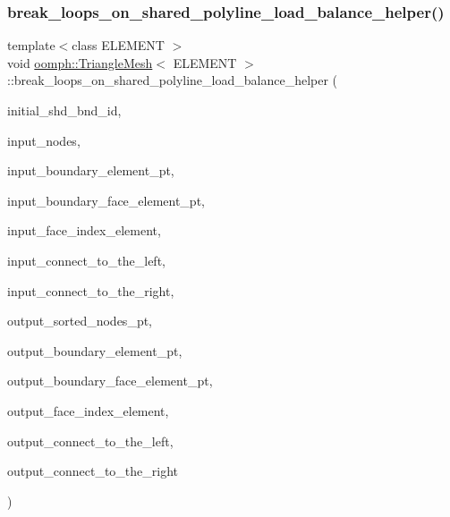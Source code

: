 \subsubsection{\texorpdfstring{break\+\_\+loops\+\_\+on\+\_\+shared\+\_\+polyline\+\_\+load\+\_\+balance\+\_\+helper()}{break\_loops\_on\_shared\_polyline\_load\_balance\_helper()}}
{\footnotesize\ttfamily template$<$class E\+L\+E\+M\+E\+NT $>$ \\
void \hyperlink{classoomph_1_1TriangleMesh}{oomph\+::\+Triangle\+Mesh}$<$ E\+L\+E\+M\+E\+NT $>$\+::break\+\_\+loops\+\_\+on\+\_\+shared\+\_\+polyline\+\_\+load\+\_\+balance\+\_\+helper (\begin{DoxyParamCaption}\item[{const unsigned \&}]{initial\+\_\+shd\+\_\+bnd\+\_\+id,  }\item[{std\+::list$<$ \hyperlink{classoomph_1_1Node}{Node} $\ast$$>$ \&}]{input\+\_\+nodes,  }\item[{\hyperlink{classoomph_1_1Vector}{Vector}$<$ \hyperlink{classoomph_1_1FiniteElement}{Finite\+Element} $\ast$$>$ \&}]{input\+\_\+boundary\+\_\+element\+\_\+pt,  }\item[{\hyperlink{classoomph_1_1Vector}{Vector}$<$ \hyperlink{classoomph_1_1FiniteElement}{Finite\+Element} $\ast$$>$ \&}]{input\+\_\+boundary\+\_\+face\+\_\+element\+\_\+pt,  }\item[{\hyperlink{classoomph_1_1Vector}{Vector}$<$ int $>$ \&}]{input\+\_\+face\+\_\+index\+\_\+element,  }\item[{const int \&}]{input\+\_\+connect\+\_\+to\+\_\+the\+\_\+left,  }\item[{const int \&}]{input\+\_\+connect\+\_\+to\+\_\+the\+\_\+right,  }\item[{\hyperlink{classoomph_1_1Vector}{Vector}$<$ std\+::list$<$ \hyperlink{classoomph_1_1Node}{Node} $\ast$$>$ $>$ \&}]{output\+\_\+sorted\+\_\+nodes\+\_\+pt,  }\item[{\hyperlink{classoomph_1_1Vector}{Vector}$<$ \hyperlink{classoomph_1_1Vector}{Vector}$<$ \hyperlink{classoomph_1_1FiniteElement}{Finite\+Element} $\ast$$>$ $>$ \&}]{output\+\_\+boundary\+\_\+element\+\_\+pt,  }\item[{\hyperlink{classoomph_1_1Vector}{Vector}$<$ \hyperlink{classoomph_1_1Vector}{Vector}$<$ \hyperlink{classoomph_1_1FiniteElement}{Finite\+Element} $\ast$$>$ $>$ \&}]{output\+\_\+boundary\+\_\+face\+\_\+element\+\_\+pt,  }\item[{\hyperlink{classoomph_1_1Vector}{Vector}$<$ \hyperlink{classoomph_1_1Vector}{Vector}$<$ int $>$ $>$ \&}]{output\+\_\+face\+\_\+index\+\_\+element,  }\item[{\hyperlink{classoomph_1_1Vector}{Vector}$<$ int $>$ \&}]{output\+\_\+connect\+\_\+to\+\_\+the\+\_\+left,  }\item[{\hyperlink{classoomph_1_1Vector}{Vector}$<$ int $>$ \&}]{output\+\_\+connect\+\_\+to\+\_\+the\+\_\+right }\end{DoxyParamCaption})\hspace{0.3cm}{\ttfamily [protected]}}



